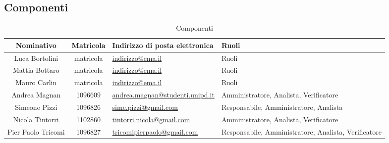 \documentclass[a4paper,titlepage]{article}
\begin{document}
\subsection{Componenti}
\begin{table}[H]
	\begin{center}
		\setlength{\extrarowheight}{\jot}
		\begin{tabular}{|c|c|p{5cm}|p{4.3cm}|}
			\hline
			\textbf{Nominativo} & \textbf{Matricola} & \raggedright \textbf{Indirizzo di posta elettronica} & \textbf{Ruoli} \\[1ex]
			\hline
	 		Luca Bortolini & matricola	& \href{mailto:indirizzo@ema.il}{indirizzo@ema.il} & Ruoli \\[1ex]
			\hline
			Mattia Bottaro & matricola	& \href{mailto:indirizzo@ema.il}{indirizzo@ema.il} & Ruoli \\[1ex]
			\hline
			Mauro Carlin & matricola	& \href{mailto:indirizzo@ema.il}{indirizzo@ema.il} & Ruoli	\\[1ex]
			\hline
			Andrea Magnan & 1096609 & \href{mailto:andrea.magnan@studenti.unipd.it}{andrea.magnan@studenti.unipd.it} & Amministratore, Analista, Verificatore\\[1ex]
			\hline
			Simeone Pizzi & 1096826	& \href{mailto:sime.pizzi@gmail.com}{sime.pizzi@gmail.com} 	& Responsabile, Amministratore, Analista \\[1ex]
			\hline
			Nicola Tintorri	& 1102860 & \href{mailto:tintorri.nicola@gmail.com}{tintorri.nicola@gmail.com} & Amministratore, Analista, Verificatore 	\\[1ex]
			\hline
			Pier Paolo Tricomi	& 1096827	& \href{mailto:tricomipierpaolo@gmail.com}{tricomipierpaolo@gmail.com} & Responsabile, Amministratore, Analista, Verificatore \\[1ex]
			\hline	
		\end{tabular}
	\end{center}
	\caption{Componenti}
\end{table}
\end{document}
